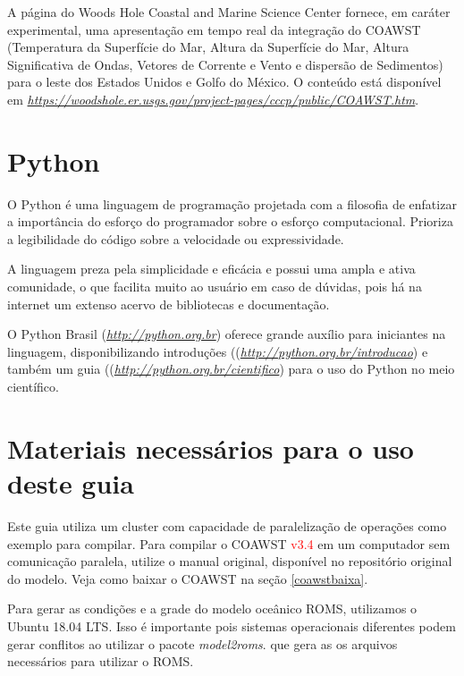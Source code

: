 \noindent A página do Woods Hole Coastal and Marine Science Center fornece, em caráter experimental, uma apresentação em 
          tempo real da integração do COAWST (Temperatura da Superfície do Mar, Altura da Superfície do Mar, Altura Significativa
          de Ondas, Vetores de Corrente e Vento e dispersão de Sedimentos) para o leste dos Estados Unidos e Golfo do México.
          O conteúdo está disponível em \textcolor{bleu_cite}{\href{https://woodshole.er.usgs.gov/project-pages/cccp/public/COAWST.htm}{\textit{https://woodshole.er.usgs.gov/project-pages/cccp/public/COAWST.htm}}}.
\bigskip

\section{Python}
\bigskip

\noindent O Python é uma linguagem de programação projetada com a filosofia de enfatizar a importância 
          do esforço do programador sobre o esforço computacional. Prioriza a legibilidade do código sobre 
          a velocidade ou expressividade.
\bigskip

\noindent A linguagem preza pela simplicidade e eficácia e possui uma ampla e ativa comunidade, o que facilita muito ao
         usuário em caso de dúvidas, pois há na internet um extenso acervo de bibliotecas e documentação.
\bigskip

\noindent O Python Brasil (\textcolor{bleu_cite}{\href{http://python.org.br}{\textit{http://python.org.br}}}) oferece
          grande auxílio para iniciantes na linguagem, disponibilizando introduções ((\textcolor{bleu_cite}{\href{http://python.org.br/introducao}{\textit{http://python.org.br/introducao}}}) 
          e também um guia ((\textcolor{bleu_cite}{\href{http://python.org.br/cientifico}{\textit{http://python.org.br/cientifico}}}) para o uso do 
          Python no meio científico.



\section{Materiais necessários para o uso deste guia}
\bigskip

\noindent Este guia utiliza um cluster com capacidade de paralelização de operações como exemplo para compilar. Para compilar o COAWST \textcolor{red}{v3.4}
          em um computador sem comunicação paralela, utilize o manual original, disponível no repositório original do modelo. 
          Veja como baixar o COAWST na seção \textcolor{bleu_cite}{\ref{coawstbaixa}}.
\bigskip

\noindent Para gerar as condições e a grade do modelo oceânico ROMS, utilizamos o Ubuntu 18.04 LTS. Isso é importante pois sistemas
          operacionais diferentes podem gerar conflitos ao utilizar o pacote \textit{model2roms}. que gera as os arquivos necessários para utilizar o ROMS.